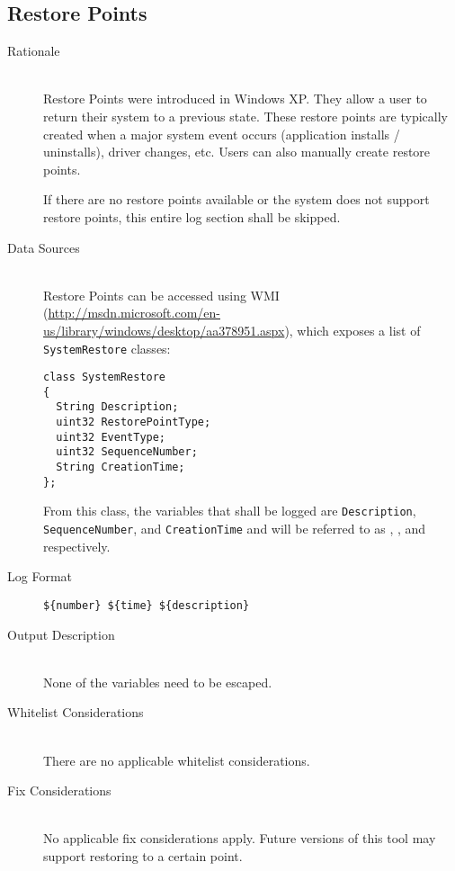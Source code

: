 \subsection{Restore Points}
\begin{description}
\item[Rationale] \hfill \\
Restore Points were introduced in Windows XP.  They allow a user to return their
system to a previous state.  These restore points are typically created when a
major system event occurs (application installs / uninstalls), driver changes,
etc.  Users can also manually create restore points. 

If there are no restore points available or the system does not support restore
points, this entire log section shall be skipped.
\item[Data Sources] \hfill \\
Restore Points can be accessed using WMI
(\url{http://msdn.microsoft.com/en-us/library/windows/desktop/aa378951.aspx}),
which exposes a list of \texttt{SystemRestore} classes:
\vspace{-\baselineskip}
\begin{verbatim}
class SystemRestore
{
  String Description;
  uint32 RestorePointType;
  uint32 EventType;
  uint32 SequenceNumber;
  String CreationTime;
};
\end{verbatim}
From this class, the variables that shall be logged are \texttt{Description},
\texttt{SequenceNumber}, and \texttt{CreationTime} and will be referred to as
, , and  respectively.
\item[Log Format] \hfill
\vspace{-\baselineskip}
\begin{verbatim}
${number} ${time} ${description}
\end{verbatim}
\item[Output Description] \hfill \\
None of the variables need to be escaped.
\item[Whitelist Considerations] \hfill \\
There are no applicable whitelist considerations.
\item[Fix Considerations] \hfill \\
No applicable fix considerations apply.  Future versions of this tool may
support restoring to a certain point.  
\end{description}

